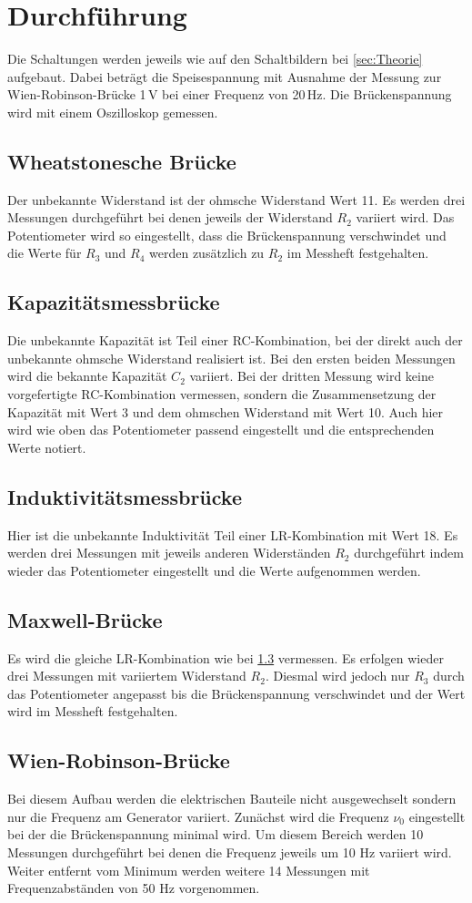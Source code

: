 \section{Durchführung}
\label{sec:Durchführung}

Die Schaltungen werden jeweils wie auf den Schaltbildern bei 
\ref{sec:Theorie} aufgebaut. Dabei beträgt die
Speisespannung mit Ausnahme der Messung
zur Wien-Robinson-Brücke 1\,V bei einer Frequenz von 20\,Hz. Die Brückenspannung wird
mit einem Oszilloskop gemessen.
\subsection{Wheatstonesche Brücke}
Der unbekannte Widerstand ist der ohmsche Widerstand Wert 11.
Es werden drei Messungen durchgeführt bei denen jeweils der Widerstand $R_2$
variiert wird. Das Potentiometer wird so eingestellt,
dass die Brückenspannung verschwindet und die Werte
für $R_3$ und $R_4$ werden zusätzlich zu $R_2$ im Messheft festgehalten.
\subsection{Kapazitätsmessbrücke}
Die unbekannte Kapazität ist Teil einer RC-Kombination,
bei der direkt auch der unbekannte ohmsche Widerstand realisiert ist.
Bei den ersten beiden Messungen wird die bekannte Kapazität $C_2$ variiert.
Bei der dritten Messung wird keine vorgefertigte RC-Kombination vermessen, sondern die 
Zusammensetzung der Kapazität mit Wert 3 und dem ohmschen Widerstand mit Wert 10.
Auch hier wird wie oben das Potentiometer passend eingestellt und die
entsprechenden Werte notiert.
\subsection{Induktivitätsmessbrücke}
\label{sec:Indu}
Hier ist die unbekannte Induktivität Teil einer LR-Kombination
mit Wert 18. Es werden drei Messungen mit jeweils anderen Widerständen $R_2$
durchgeführt indem wieder das Potentiometer eingestellt und die Werte aufgenommen werden.
\subsection{Maxwell-Brücke}
Es wird die gleiche LR-Kombination wie bei \ref{sec:Indu} vermessen.
Es erfolgen wieder drei Messungen mit variiertem Widerstand $R_2$. Diesmal
wird jedoch nur $R_3$ durch das Potentiometer angepasst bis die
Brückenspannung verschwindet und der Wert wird im Messheft festgehalten.

\subsection{Wien-Robinson-Brücke}
Bei diesem Aufbau werden die elektrischen Bauteile
nicht ausgewechselt sondern nur die Frequenz am 
Generator variiert. Zunächst wird die Frequenz $\nu_0$ eingestellt
bei der die Brückenspannung minimal wird. Um diesem Bereich werden
10 Messungen durchgeführt bei denen die Frequenz jeweils um 10 Hz
variiert wird. Weiter entfernt vom Minimum werden weitere 14 Messungen
mit Frequenzabständen von 50 Hz vorgenommen.

